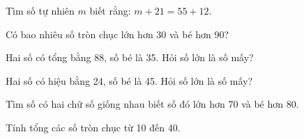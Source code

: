 \begin{ex}
Tìm số tự nhiên $m$ biết rằng: $m + 21 = 55 + 12$.
\end{ex}

\begin{ex}
Có bao nhiêu số tròn chục lớn hơn 30 và bé hơn 90?
\end{ex}

\begin{ex}
Hai số có tổng bằng 88, số bé là 35. Hỏi số lớn là số mấy?
\end{ex}

\begin{ex}
Hai số có hiệu bằng 24, số bé là 45. Hỏi số lớn là số mấy?
\end{ex}

\begin{ex}
Tìm số có hai chữ số giống nhau biết số đó lớn hơn 70 và bé hơn 80.
\end{ex}

\begin{ex}
Tính tổng các số tròn chục từ 10 đến 40.
\end{ex}
